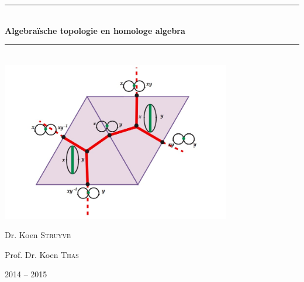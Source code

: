 \documentclass[12pt]{book}
\newcommand{\HRule}{\rule{\linewidth}{0.5mm}}
\begin{document}
\begin{titlepage}
\begin{center}


%
%

\HRule \\[0.4cm]
{ \huge \bfseries Algebra\"ische topologie en homologe algebra \\[0.4cm] }

\HRule \\[3cm]

\includegraphics[width=0.75\textwidth]{images/outer.jpg}~\\[3cm]


\begin{minipage}{0.4\textwidth}
\begin{flushleft} \large
\large Dr. Koen \textsc{Struyve}
\end{flushleft}
\end{minipage}%
\begin{minipage}{0.4\textwidth}
\begin{flushright} \large
Prof. Dr. Koen \textsc{Thas}
\end{flushright}
\end{minipage}

\vfill

{\large 2014 -- 2015}

\end{center}
\end{titlepage}


\end{document}
